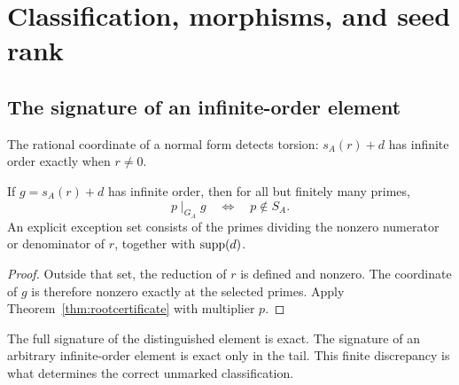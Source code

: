 \chapter{Classification, morphisms, and seed rank}
\label{ch:classification}

\section{The signature of an infinite-order element}
The rational coordinate of a normal form detects torsion: $s_A(r)+d$ has infinite order exactly when $r\ne0$.

\begin{lemma}
\label{thm:tailsignature}
If $g=s_A(r)+d$ has infinite order, then for all but finitely many primes,
\[
p\mid_{G_A}g\quad\Longleftrightarrow\quad p\notin S_A.
\]
An explicit exception set consists of the primes dividing the nonzero numerator or denominator of $r$, together with $\operatorname{supp}(d)$.
\end{lemma}
\begin{proof}
Outside that set, the reduction of $r$ is defined and nonzero. The coordinate of $g$ is therefore nonzero exactly at the selected primes. Apply Theorem~\ref{thm:rootcertificate} with multiplier $p$.
\end{proof}
The full signature of the distinguished element is exact. The signature of an arbitrary infinite-order element is exact only in the tail. This finite discrepancy is what determines the correct unmarked classification.


